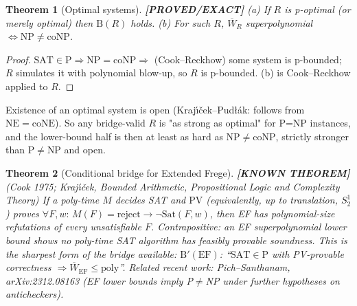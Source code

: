 \documentclass[11pt]{article}
\newtheorem{theorem}{Theorem}
\theoremstyle{remark}
\newcommand{\status}[1]{\textbf{[#1]}}
\newcommand{\SAT}{\mathrm{SAT}}
\begin{document}
\begin{theorem}[Optimal systems] \status{PROVED/EXACT}
(a) If $R$ is p-optimal (or merely optimal) then $\mathrm B(R)$ holds. (b) For such $R$, $\overline W_R$ superpolynomial $\iff \mathrm{NP}\neq\mathrm{coNP}$.
\end{theorem}
\begin{proof} $\SAT\in\mathrm P\Rightarrow\mathrm{NP}=\mathrm{coNP}\Rightarrow$ (Cook--Reckhow) some system is p-bounded; $R$ simulates it with polynomial blow-up, so $R$ is p-bounded. (b) is Cook--Reckhow applied to $R$. \end{proof}
Existence of an optimal system is open (Kraj\'{\i}\v{c}ek--Pud\l{}\'ak: follows from $\mathrm{NE}=\mathrm{coNE}$). So any bridge-valid $R$ is "as strong as optimal" for P=NP instances, and the lower-bound half is then at least as hard as $\mathrm{NP}\neq\mathrm{coNP}$, strictly stronger than P$\neq$NP and open.

\begin{theorem}[Conditional bridge for Extended Frege] \status{KNOWN THEOREM} (Cook 1975; Kraj\'{\i}\v{c}ek, \emph{Bounded Arithmetic, Propositional Logic and Complexity Theory})
If a poly-time $M$ decides SAT and $\mathrm{PV}$ (equivalently, up to translation, $S^1_2$) proves $\forall F,w:\,M(F)=\text{reject}\to\neg\mathrm{Sat}(F,w)$, then EF has polynomial-size refutations of every unsatisfiable $F$. Contrapositive: an EF superpolynomial lower bound shows no poly-time SAT algorithm has feasibly provable soundness. This is the sharpest form of the bridge available: $\mathrm B'(\mathrm{EF})$: ``$\SAT\in\mathrm P$ \emph{with PV-provable correctness} $\Rightarrow\overline W_{\mathrm{EF}}\le\mathrm{poly}$''. Related recent work: Pich--Santhanam, arXiv:2312.08163 (EF lower bounds imply P$\neq$NP under further hypotheses on anticheckers).
\end{theorem}
\end{document}
